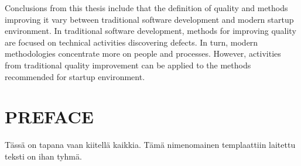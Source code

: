 \noindent
Conclusions from this thesis include that the definition of quality and methods improving it vary between traditional software development and modern startup environment. In traditional software development, methods for improving quality are focused on technical activities discovering defects. In turn, modern methodologies concentrate more on people and processes. However, activities from traditional quality improvement can be applied to the methods recommended for startup environment.


\newpage
 
\chapter*{PREFACE}
\noindent 

Tässä on tapana vaan kiitellä kaikkia. Tämä nimenomainen templaattiin laitettu teksti on ihan tyhmä.
 
\newpage
\tableofcontents

%  
%  
%  
 
 
\newpage
\renewcommand{\chaptermark}[1]{\markboth{\thechapter. \ #1}{}}
\renewcommand{\sectionmark}[1]{\markright{}{}}
\lhead{\fancyplain{}{\leftmark}}
 
